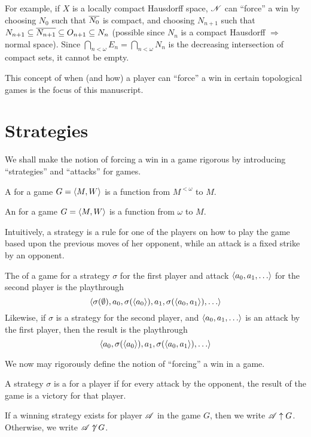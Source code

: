 For example, if $X$ is a locally compact Hausdorff space, $\mathscr{N}$ can ``force'' 
a win by choosing $N_0$ such that $\overline{N_0}$ is compact, and choosing 
$N_{n+1}$ such that 
$N_{n+1}\subseteq\overline{N_{n+1}}\subseteq O_{n+1}\subseteq N_n$ 
(possible since $N_n$ is a compact Hausdorff $\Rightarrow$ normal space). 
Since $\bigcap_{n<\omega} E_n = \bigcap_{n<\omega} N_n$ is the decreasing 
intersection of compact sets, it cannot be empty.

This concept of when (and how) a player can ``force'' a win in certain
topological games is the focus of this manuscript.



\section{Strategies}

We shall make the notion of forcing a win in a game rigorous by introducing
``strategies'' and ``attacks'' for games.

\begin{defn}
  A  for a game $G=\langle M,W\rangle$ is a function 
  from $M^{<\omega}$ to $M$.
\end{defn}

\begin{defn}
  An  for a game $G=\langle M,W\rangle$ is a function 
  from $\omega$ to $M$.
\end{defn}

Intuitively, a strategy is a rule for one of the players on how to play
the game based upon the previous moves of her opponent, while an attack is
a fixed strike by an opponent.

\begin{defn}
  The  of a game for a strategy $\sigma$ for the first player and 
  attack $\<a_0,a_1,\dots\>$ for  the second player is the playthrough
    \[
      \<\sigma(\emptyset),a_0,\sigma(\<a_0\>), a_1, \sigma(\<a_0,a_1\>),\dots\>
    \]
  Likewise, if $\sigma$ is a strategy for the second player, and 
  $\<a_0,a_1,\dots\>$ is an attack by the first player, then the result is
  the playthrough
    \[
      \<a_0,\sigma(\<a_0\>), a_1, \sigma(\<a_0,a_1\>),\dots\>
    \]
\end{defn}

We now may rigorously define the notion of ``forcing'' a win in a game.

\begin{defn}
  A strategy $\sigma$ is a  for a player if for
  every attack by the opponent, the result of the game is a victory 
  for that player.

  If a winning strategy exists for player $\mathscr{A}$ in the game $G$, then we
  write $\mathscr{A} \uparrow G$. Otherwise, we write $\mathscr{A} \not\uparrow G$.
\end{defn}


